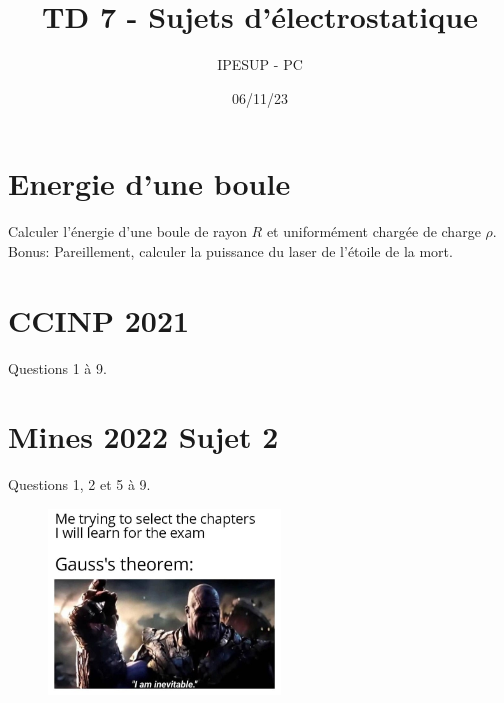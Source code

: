 \documentclass{article}
\title{TD 7 - Sujets d'électrostatique}
\author{IPESUP - PC }
\date{06/11/23}
\begin{document}
\maketitle

\section{Energie d'une boule}

Calculer l'énergie d'une boule de rayon $R$ et uniformément chargée de charge $\rho$. \\
Bonus: Pareillement, calculer la puissance du laser de l'étoile de la mort.

\section{CCINP 2021}

Questions 1 à 9. 

\section{Mines 2022 Sujet 2}

Questions 1, 2 et 5 à 9. \\[2cm]

\begin{figure}[h]
    \centering
    \includegraphics[width=0.55\textwidth]{meme.jpg}
\end{figure}
\end{document}
